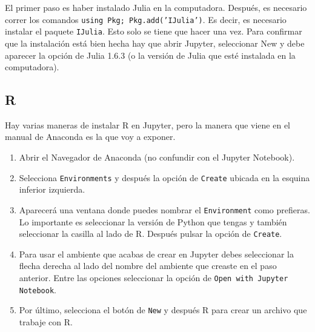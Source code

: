 El primer paso es haber instalado Julia en la computadora. Después, es necesario correr los comandos \texttt{using Pkg; Pkg.add('IJulia')}. Es decir, es necesario instalar el paquete \texttt{IJulia}. Esto solo se tiene que hacer una vez. Para confirmar que la instalación está bien hecha hay que abrir Jupyter, seleccionar \textsf{New} y debe aparecer la opción de \textsf{Julia 1.6.3} (o la versión de Julia que esté instalada en la computadora). 

\subsection{R}

Hay varias maneras de instalar R en Jupyter, pero la manera que viene en el manual de Anaconda \cite{anaconda_doc} es la que voy a exponer. 

\begin{enumerate}
	\item Abrir el Navegador de Anaconda (no confundir con el Jupyter Notebook).
	
	\item Selecciona \texttt{Environments} y después la opción de \texttt{Create} ubicada en la esquina inferior izquierda. 
	
	\item Aparecerá una ventana donde puedes nombrar el \texttt{Environment} como prefieras. Lo importante es seleccionar la versión de Python que tengas y también seleccionar la casilla al lado de R. Después pulsar la opción de \texttt{Create}. 
	
	\item Para usar el ambiente que acabas de crear en Jupyter debes seleccionar la flecha derecha al lado del nombre del ambiente que creaste en el paso anterior. Entre las opciones seleccionar la opción de \texttt{Open with Jupyter Notebook}. 
	
	\item Por último, selecciona el botón de \texttt{New} y después R para crear un archivo que trabaje con R. 
\end{enumerate}
